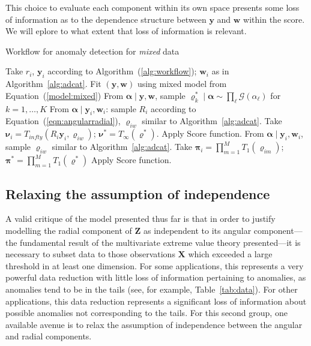     This choice to evaluate each component within its own space presents some 
    loss of information as to the dependence structure between $\bm{y}$ and 
    $\bm{w}$ within the score.  We will eplore to what extent that loss of 
    information is relevant.

\begin{algorithm}[htb]
    \caption{Workflow for anomaly detection for \emph{mixed} data}\label{alg:admixed}
    \begin{algorithmic}[1]
        \State Take $r_i$, $\bm{y}_i$ according to Algorithm~(\ref{alg:workflow}); $\bm{w}_i$ as in Algorithm~\ref{alg:adcat}.
        \State Fit $(\bm{y},\bm{w})$ using mixed model from Equation~(\ref{model:mixed})
        \State From $\bm{\alpha}\mid\bm{y},\bm{w}$, sample
            $\bm{\varrho}_k^{*}\mid\bm{\alpha}\sim\prod_{\ell}\mathcal{G}(\alpha_{\ell})$ for $k = 1,\ldots,K$
            \State From $\bm{\alpha}\mid\bm{y}_i,\bm{w}_i$:
                sample $R_i$ according to Equation~(\ref{eqn:angularradial}), 
                $\bm{\varrho}_{iw}$ similar to Algorithm~\ref{alg:adcat}.
            \State Take $\bm{\nu}_i = T_{infty}(R_i\bm{y}_i,\bm{\varrho}_{iw})$;      
                $\bm{\nu}^* = T_{\infty}(\bm{\varrho}^*)$.
            \State Apply Score function.
            \State From $\bm{\alpha}\mid\bm{y}_i,\bm{w}_i$, 
                sample $\bm{\varrho}_{iw}$ similar to Algorithm~\ref{alg:adcat}.
            \State Take $\bm{\pi}_i = \prod_{m = 1}^M T_{1}(\bm{\varrho}_{im})$;    
                $\bm{\pi}^* = \prod_{m = 1}^{M} T_1(\bm{\varrho}^*)$
            \State Apply Score function.
        \EndIf
    \end{algorithmic}
\end{algorithm}

\subsection{Relaxing the assumption of independence\label{subsec:rank}}
A valid critique of the model presented thus far is that in order to justify 
    modelling the radial component of $\bm{Z}$ as independent to its angular 
    component---the fundamental result of the multivariate extreme value theory 
    presented---it is necessary to subset data to those observations $\bm{X}$ which exceeded a large 
    threshold in at least one dimension.  For some applications, 
    this represents a very powerful data reduction with little loss of 
    information pertaining to anomalies, as anomalies tend to be in the tails 
    (see, for  example, Table~\ref{tab:data}).  For other applications, this 
    data reduction represents a significant loss of information about possible
    anomalies not corresponding to the tails.  For this second group,
    one available avenue is to relax the assumption of independence between the 
    angular and radial components.

